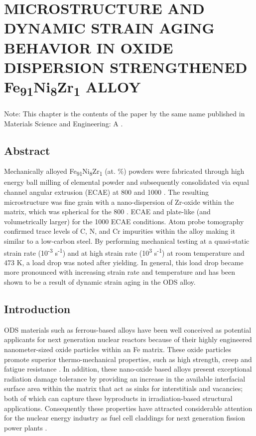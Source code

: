 


\chapter{MICROSTRUCTURE AND DYNAMIC STRAIN AGING BEHAVIOR IN OXIDE DISPERSION STRENGTHENED Fe\textsubscript{91}Ni\textsubscript{8}Zr\textsubscript{1} ALLOY} 



Note: This chapter is the contents of the paper by the same name published in Materials Science and Engineering: A \cite{RN267}.

\section*{Abstract}
Mechanically alloyed Fe\textsubscript{91}Ni\textsubscript{8}Zr\textsubscript{1} (at. $\%$) powders were fabricated through high energy ball milling of elemental powder and subsequently consolidated via equal channel angular extrusion (ECAE) at 800 \celsius{} and 1000 \celsius{}. The resulting microstructure was fine grain with a nano-dispersion of Zr-oxide within the matrix, which was spherical for the 800 \celsius{}. ECAE and plate-like (and volumetrically larger) for the 1000 \celsius{} ECAE conditions. Atom probe tomography confirmed trace levels of C, N, and Cr impurities within the alloy making it similar to a low-carbon steel. By performing mechanical testing at a quasi-static strain rate (10\textsuperscript{-3} s\textsuperscript{-1}) and at high strain rate (10\textsuperscript{3} s\textsuperscript{-1}) at room temperature and 473 K, a load drop was noted after yielding. In general, this load drop became more pronounced with increasing strain rate and temperature and has been shown to be a result of dynamic strain aging in the ODS alloy. 



\section*{Introduction}
	ODS materials such as ferrous-based alloys have been well conceived as potential applicants for next generation nuclear reactors because of their highly engineered nanometer-sized oxide particles within an Fe matrix. These oxide particles promote superior thermo-mechanical properties, such as high strength, creep and fatigue resistance \cite{RN1358,RN1209}.  In addition, these nano-oxide based alloys present exceptional radiation damage tolerance by providing an increase in the available interfacial surface area within the matrix that act as sinks for interstitials and vacancies; both of which can capture these byproducts in irradiation-based structural applications. Consequently these properties have attracted considerable attention for the nuclear energy industry as fuel cell claddings for next generation fission power plants \cite{RN971,RN733}. 
	
